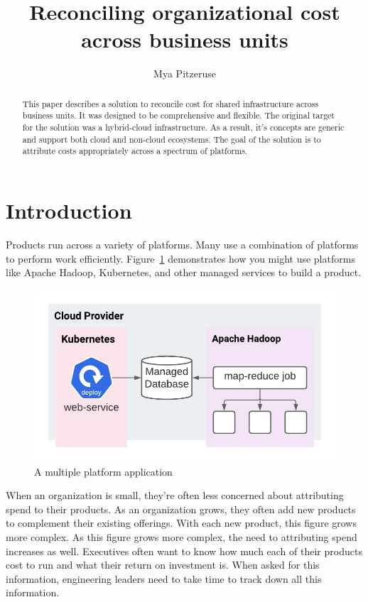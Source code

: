 \documentclass[10pt, a4paper, twocolumn]{article}
\title{Reconciling organizational cost across business units}
\author{Mya Pitzeruse}
\begin{document}
\maketitle

\begin{abstract}
  This paper describes a solution to reconcile cost for shared infrastructure across business units.
  It was designed to be comprehensive and flexible.
  The original target for the solution was a hybrid-cloud infrastructure.
  As a result, it's concepts are generic and support both cloud and non-cloud ecosystems.
  The goal of the solution is to attribute costs appropriately across a spectrum of platforms.
\end{abstract}


\section*{Introduction}
  Products run across a variety of platforms.
  Many use a combination of platforms to perform work efficiently.
  Figure~\ref{figure:1} demonstrates how you might use platforms like Apache Hadoop, Kubernetes, and other managed services to build a product.

  \begin{figure}[H]
    \centering
    \includegraphics[width=\linewidth]{./truth-and-reconciliation-application.png}
    \caption{A multiple platform application}
    \label{figure:1}
  \end{figure}

  When an organization is small, they're often less concerned about attributing spend to their products.
  As an organization grows, they often add new products to complement their existing offerings.
  With each new product, this figure grows more complex.
  As this figure grows more complex, the need to attributing spend increases as well.
  Executives often want to know how much each of their products cost to run and what their return on investment is.
  When asked for this information, engineering leaders need to take time to track down all this information.
\end{document}
